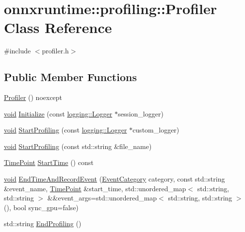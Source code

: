 \hypertarget{classonnxruntime_1_1profiling_1_1Profiler}{}\section{onnxruntime\+:\+:profiling\+:\+:Profiler Class Reference}
\label{classonnxruntime_1_1profiling_1_1Profiler}


{\ttfamily \#include $<$profiler.\+h$>$}

\subsection*{Public Member Functions}
\begin{DoxyCompactItemize}
\item 
\mbox{\hyperlink{classonnxruntime_1_1profiling_1_1Profiler_aaaad4b91eaed51fe42285e4bc7905563}{Profiler}} () noexcept
\item 
\mbox{\hyperlink{mlasi_8h_a88f941d423cb2a819b70a1358982b1a6}{void}} \mbox{\hyperlink{classonnxruntime_1_1profiling_1_1Profiler_a7b28c8b018d08e70aac7b5ef322c08cb}{Initialize}} (const \mbox{\hyperlink{classonnxruntime_1_1logging_1_1Logger}{logging\+::\+Logger}} $\ast$session\+\_\+logger)
\item 
\mbox{\hyperlink{mlasi_8h_a88f941d423cb2a819b70a1358982b1a6}{void}} \mbox{\hyperlink{classonnxruntime_1_1profiling_1_1Profiler_ad4289ee2fe6bc266a8ce5322f03ec2e2}{Start\+Profiling}} (const \mbox{\hyperlink{classonnxruntime_1_1logging_1_1Logger}{logging\+::\+Logger}} $\ast$custom\+\_\+logger)
\item 
\mbox{\hyperlink{mlasi_8h_a88f941d423cb2a819b70a1358982b1a6}{void}} \mbox{\hyperlink{classonnxruntime_1_1profiling_1_1Profiler_a9570fec28a8e43eb2937ba6383185661}{Start\+Profiling}} (const std\+::string \&file\+\_\+name)
\item 
\mbox{\hyperlink{namespaceonnxruntime_a9b5a17a572f7c3cf77f4892542bd7153}{Time\+Point}} \mbox{\hyperlink{classonnxruntime_1_1profiling_1_1Profiler_a273e1d74c3db999223080120ea89705d}{Start\+Time}} () const
\item 
\mbox{\hyperlink{mlasi_8h_a88f941d423cb2a819b70a1358982b1a6}{void}} \mbox{\hyperlink{classonnxruntime_1_1profiling_1_1Profiler_a4dc59c0289a90e418afdca6aba5e3488}{End\+Time\+And\+Record\+Event}} (\mbox{\hyperlink{namespaceonnxruntime_1_1profiling_acbb1d7474c26b32c5bfef2ce1ab63734}{Event\+Category}} category, const std\+::string \&event\+\_\+name, \mbox{\hyperlink{namespaceonnxruntime_a9b5a17a572f7c3cf77f4892542bd7153}{Time\+Point}} \&start\+\_\+time, std\+::unordered\+\_\+map$<$ std\+::string, std\+::string $>$ \&\&event\+\_\+args=std\+::unordered\+\_\+map$<$ std\+::string, std\+::string $>$(), bool sync\+\_\+gpu=false)
\item 
std\+::string \mbox{\hyperlink{classonnxruntime_1_1profiling_1_1Profiler_a24b5e686899d37eedc159d9af7936458}{End\+Profiling}} ()
\end{DoxyCompactItemize}


